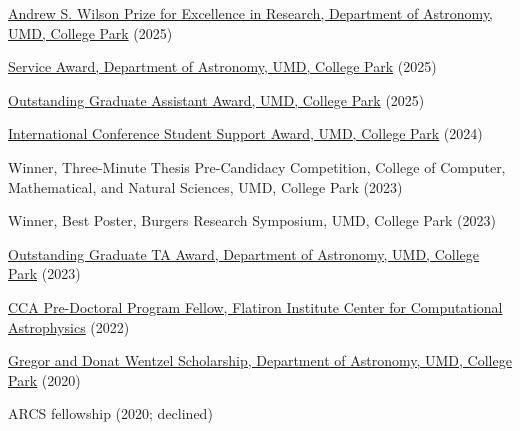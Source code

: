 \item[{\color{numcolor}\scriptsize18}] \href{https://www.astro.umd.edu/resources/internal/awards/dept/service.html}{Andrew S. Wilson Prize for Excellence in Research, Department of Astronomy, UMD, College Park} (2025)

\item[{\color{numcolor}\scriptsize17}] \href{https://www.astro.umd.edu/resources/internal/awards/dept/service.html}{Service Award, Department of Astronomy, UMD, College Park} (2025)


\item[{\color{numcolor}\scriptsize16}] \href{https://gradschool.umd.edu/sites/default/files/2025-05/OGA_AY24-25.pdf}{Outstanding Graduate Assistant Award, UMD, College Park} (2025)

\item[{\color{numcolor}\scriptsize15}] \href{https://gradschool.umd.edu/funding/student-fellowships-awards/graduate-school-travel-grants}{International Conference Student Support Award, UMD, College Park} (2024)

\item[{\color{numcolor}\scriptsize14}] Winner, Three-Minute Thesis Pre-Candidacy Competition, College of Computer, Mathematical, and Natural Sciences, UMD, College Park (2023)

\item[{\color{numcolor}\scriptsize13}] Winner, Best Poster, Burgers Research Symposium, UMD, College Park (2023)

\item[{\color{numcolor}\scriptsize12}] \href{https://www.astro.umd.edu/resources/internal/awards/dept/angerhofer.html}{Outstanding Graduate TA Award, Department of Astronomy, UMD, College Park} (2023)

\item[{\color{numcolor}\scriptsize11}] \href{https://www.simonsfoundation.org/flatiron-institute-center-for-computational-astrophysics-pre-doctoral-program/}{CCA Pre-Doctoral Program Fellow, Flatiron Institute Center for Computational Astrophysics} (2022)

\item[{\color{numcolor}\scriptsize10}] \href{https://www.astro.umd.edu/resources/internal/awards/dept/wentzel.html}{Gregor and Donat Wentzel Scholarship, Department of Astronomy, UMD, College Park} (2020)

\item[{\color{numcolor}\scriptsize9}] ARCS fellowship (2020; declined)

